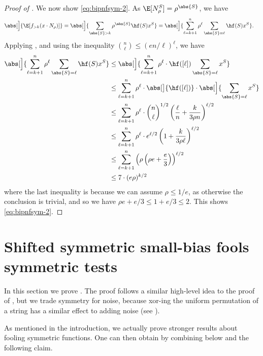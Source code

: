\begin{proof}[Proof of ]
  We now show \cref{eq:bipnfsym-2}.
  As $\E[N_\rho^S] = \rho^{\abs{S}}$, we have
  \begin{align*}
    \abs[\Big]{\E[f_{>k}(x \cdot N_\rho)]}
    = \abs[\Big]{ \sum_{\abs{S} > k} \rho^{\abs{S}} \hf(S) x^S }
    &=  \abs[\Big]{ \sum_{\ell=k+1}^n \rho^\ell \sum_{\abs{S}=\ell} \hf(S) x^S } .
  \end{align*}
  Applying , and using the inequality $\binom{n}{\ell} \le (en/\ell)^\ell$, we have
  \begin{align*}
    \abs[\Big]{ \sum_{\ell=k+1}^n \rho^\ell \sum_{\abs{S}=\ell} \hf(S) x^S }
    &\le \abs[\Big]{ \sum_{\ell=k+1}^n \rho^\ell \cdot \hf([\ell]) \sum_{\abs{S}=\ell} x^S } \\
    &\le \sum_{\ell=k+1}^n \rho^\ell \cdot \abs[\big]{\hf([\ell])} \cdot  \abs[\Big]{ \sum_{\abs{S}=\ell} x^S } \\
    &\le \sum_{\ell=k+1}^n \rho^\ell \cdot \binom{n}{\ell}^{1/2}  \left( \frac{\ell}{n} + \frac{k}{3\rho n} \right)^{\ell/2} \\
    &\le \sum_{\ell=k+1}^n \rho^\ell \cdot e^{\ell/2} \left(  1 + \frac{k}{3\rho \ell} \right)^{\ell/2} \\
    &\le \sum_{\ell=k+1}^n \left( \rho \left(  \rho e + \frac{e}{3} \right) \right)^{\ell/2} \\
    &\le 7 \cdot (e\rho)^{k/2}
  \end{align*}
  where the last inequality is because we can assume $\rho \le 1/e$, as otherwise the conclusion is trivial, and so we have $\rho e + e/3 \le 1 + e/3 \le 2$.
  This shows \cref{eq:bipnfsym-2}.
\end{proof}

\section{Shifted symmetric small-bias fools symmetric tests} \label{sec:shifted-sym-small-bias}

In this section we prove .  The proof follows a similar high-level idea to the proof of , but we trade symmetry for noise, because xor-ing the uniform permutation of a string has a similar effect to adding noise (see ).

As mentioned in the introduction, we actually prove stronger results about fooling symmetric functions.
One can then obtain  by combining  below and the following claim.


